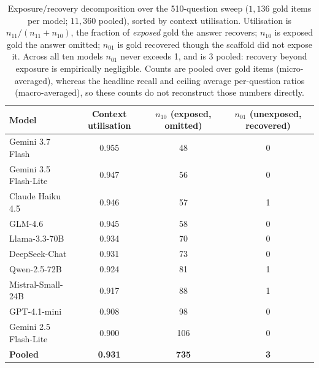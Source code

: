 \documentclass[10pt,twocolumn]{article}
\begin{document}
\begin{table}[t]\centering\small
\caption{Exposure/recovery decomposition over the 510-question sweep ($1{,}136$ gold items per model;
$11{,}360$ pooled), sorted by context utilisation. Utilisation is $n_{11}/(n_{11}+n_{10})$, the
fraction of \emph{exposed} gold the answer recovers; $n_{10}$ is exposed gold the answer omitted;
$n_{01}$ is gold recovered though the scaffold did not expose it. Across all ten models $n_{01}$ never
exceeds 1, and is 3 pooled: recovery beyond exposure is empirically negligible. Counts are pooled over
gold items (micro-averaged), whereas the headline recall and ceiling average per-question ratios
(macro-averaged), so these counts do not reconstruct those numbers directly.}
\label{tab:decomp}
\begin{tabular}{lccc}
\toprule
Model & Context utilisation & $n_{10}$ (exposed, omitted) & $n_{01}$ (unexposed, recovered) \\
\midrule
Gemini 3.7 Flash      & 0.955 & 48  & 0 \\
Gemini 3.5 Flash-Lite & 0.947 & 56  & 0 \\
Claude Haiku 4.5      & 0.946 & 57  & 1 \\
GLM-4.6               & 0.945 & 58  & 0 \\
Llama-3.3-70B         & 0.934 & 70  & 0 \\
DeepSeek-Chat         & 0.931 & 73  & 0 \\
Qwen-2.5-72B          & 0.924 & 81  & 1 \\
Mistral-Small-24B     & 0.917 & 88  & 1 \\
GPT-4.1-mini          & 0.908 & 98  & 0 \\
Gemini 2.5 Flash-Lite & 0.900 & 106 & 0 \\
\midrule
\textbf{Pooled}       & \textbf{0.931} & \textbf{735} & \textbf{3} \\
\bottomrule
\end{tabular}
\end{table}
\end{document}
